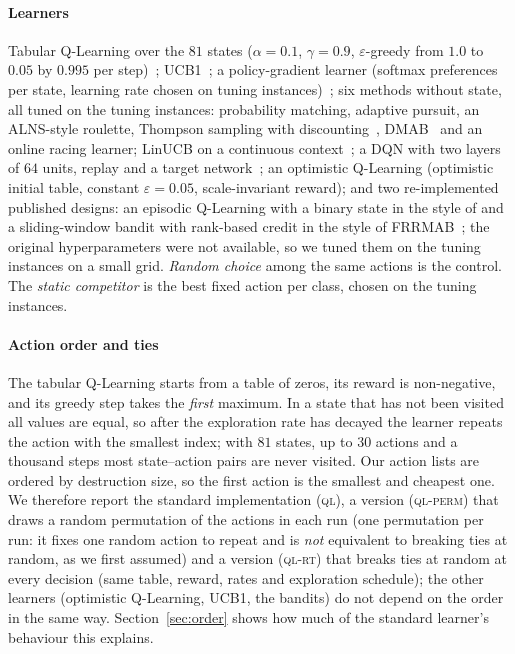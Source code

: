 \paragraph{Learners} Tabular Q-Learning over the $81$ states ($\alpha=0.1$, $\gamma=0.9$, $\varepsilon$-greedy from $1.0$ to $0.05$ by $0.995$ per step)~\cite{WatkinsDayan1992}; UCB1~\cite{AuerEtal2002}; a policy-gradient learner (softmax preferences per state, learning rate chosen on tuning instances)~\cite{Williams1992,SuttonBarto2018}; six methods without state, all tuned on the tuning instances: probability matching, adaptive pursuit, an ALNS-style roulette, Thompson sampling with discounting~\cite{Russo2018}, DMAB~\cite{DaCostaEtal2008} and an online racing learner; LinUCB on a continuous context~\cite{LiEtAl2010}; a DQN with two layers of $64$ units, replay and a target network~\cite{MnihEtAl2015}; an optimistic Q-Learning (optimistic initial table, constant $\varepsilon=0.05$, scale-invariant reward); and two re-implemented published designs: an episodic Q-Learning with a binary state in the style of \citet{KarimiMamaghanEtal2023} and a sliding-window bandit with rank-based credit in the style of FRRMAB~\cite{LiFialhoEtal2014}; the original hyperparameters were not available, so we tuned them on the tuning instances on a small grid. \emph{Random choice} among the same actions is the control. The \emph{static competitor} is the best fixed action per class, chosen on the tuning instances.

\paragraph{Action order and ties} The tabular Q-Learning starts from a table of zeros, its reward is non-negative, and its greedy step takes the \emph{first} maximum. In a state that has not been visited all values are equal, so after the exploration rate has decayed the learner repeats the action with the smallest index; with $81$ states, up to $30$ actions and a thousand steps most state--action pairs are never visited. Our action lists are ordered by destruction size, so the first action is the smallest and cheapest one. We therefore report the standard implementation (\textsc{ql}), a version (\textsc{ql-perm}) that draws a random permutation of the actions in each run (one permutation per run: it fixes one random action to repeat and is \emph{not} equivalent to breaking ties at random, as we first assumed) and a version (\textsc{ql-rt}) that breaks ties at random at every decision (same table, reward, rates and exploration schedule); the other learners (optimistic Q-Learning, UCB1, the bandits) do not depend on the order in the same way. Section~\ref{sec:order} shows how much of the standard learner's behaviour this explains.

